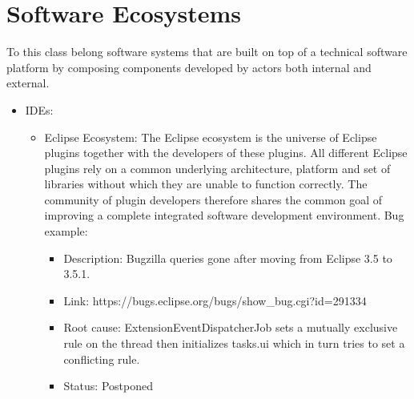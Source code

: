 \chapter{Software Ecosystems}\label{ch:softwareEcosystems}
To this class belong software systems that are built on top of a technical
software platform by composing components developed by actors both internal and
external.

\begin{itemize}
  \item IDEs:
  \begin{itemize}
    \item Eclipse Ecosystem: The Eclipse ecosystem is the universe of Eclipse
    plugins together with the developers of these plugins. All different Eclipse plugins rely on a common underlying architecture, platform and set of libraries without which they are unable to function correctly. The community of plugin developers therefore shares the common goal of improving a complete integrated software development environment. Bug example:
    \begin{itemize}
      \item Description: Bugzilla queries gone after moving from Eclipse 3.5 to
      3.5.1.
      \item Link: https://bugs.eclipse.org/bugs/show\_bug.cgi?id=291334
      \item Root cause: ExtensionEventDispatcherJob sets a mutually exclusive rule on the
      thread then initializes tasks.ui which in turn tries to set a conflicting rule.
      \item Status: Postponed
    \end{itemize}
  \end{itemize}
  

\end{itemize}
